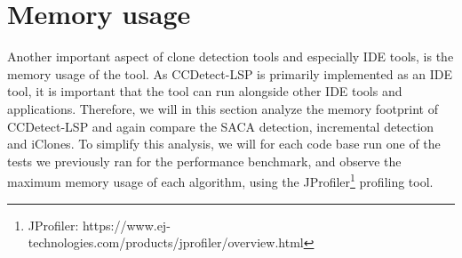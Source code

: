 \section{Memory usage}

Another important aspect of clone detection tools and especially IDE tools, is the memory
usage of the tool. As CCDetect-LSP is primarily implemented as an IDE tool, it is
important that the tool can run alongside other IDE tools and applications. Therefore, we
will in this section analyze the memory footprint of CCDetect-LSP and again compare the
SACA detection, incremental detection and iClones. To simplify this analysis, we will for
each code base run one of the tests we previously ran for the performance benchmark, and
observe the maximum memory usage of each algorithm, using the
JProfiler\footnote{JProfiler:
https://www.ej-technologies.com/products/jprofiler/overview.html} profiling tool.

